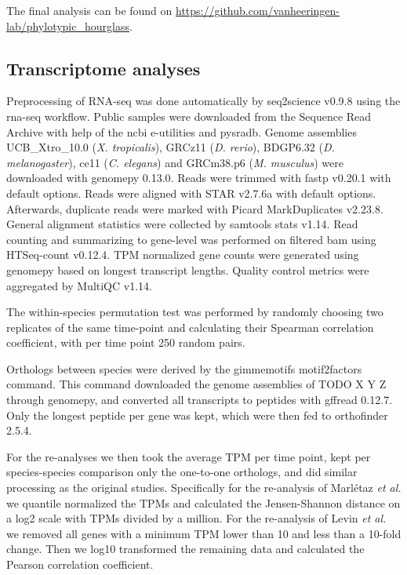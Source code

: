 The final analysis can be found on \url{https://github.com/vanheeringen-lab/phylotypic\_hourglass}.

\subsection{Transcriptome analyses}

Preprocessing of RNA-seq was done automatically by seq2science v0.9.8\cite{seq2science} using the rna-seq workflow. Public samples were downloaded from the Sequence Read Archive with help of the ncbi e-utilities and pysradb\cite{Choudhary2019}. Genome assemblies UCB\_Xtro\_10.0 (\textit{X. tropicalis}), GRCz11 (\textit{D. rerio}), BDGP6.32 (\textit{D. melanogaster}), ce11 (\textit{C. elegans}) and GRCm38.p6 (\textit{M. musculus}) were downloaded with genomepy 0.13.0\cite{Frlich2023}. Reads were trimmed with fastp v0.20.1\cite{Chen2018} with default options. Reads were aligned with STAR v2.7.6a\cite{Dobin2012} with default options. Afterwards, duplicate reads were marked with Picard MarkDuplicates v2.23.8\cite{picard}. General alignment statistics were collected by samtools stats v1.14\cite{Danecek2021}. Read counting and summarizing to gene-level was performed on filtered bam using HTSeq-count v0.12.4\cite{Anders2014}. TPM normalized gene counts were generated using genomepy based on longest transcript lengths. Quality control metrics were aggregated by MultiQC v1.14\cite{Ewels2016}. 

The within-species permutation test was performed by randomly choosing two replicates of the same time-point and calculating their Spearman correlation coefficient, with per time point 250 random pairs.

Orthologs between species were derived by the gimmemotifs motif2factors command. This command downloaded the genome assemblies of TODO X Y Z through genomepy\cite{Frlich2023}, and converted all transcripts to peptides with gffread 0.12.7\cite{Pertea2020}. Only the longest peptide per gene was kept, which were then fed to orthofinder 2.5.4\cite{Emms2019}.

For the re-analyses we then took the average TPM per time point, kept per species-species comparison only the one-to-one orthologs, and did similar processing as the original studies. Specifically for the re-analysis of Marl\'etaz \textit{et al.} we quantile normalized\cite{qnorm} the TPMs and calculated the Jensen-Shannon distance on a log2 scale with TPMs divided by a million. For the re-analysis of Levin \textit{et al.} we removed all genes with a minimum TPM lower than 10 and less than a 10-fold change. Then we log10 transformed the remaining data and calculated the Pearson correlation coefficient.

